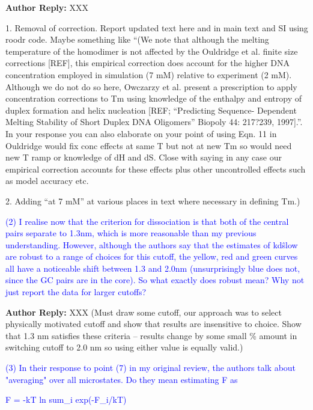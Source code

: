 \documentclass[11pt,a4paper]{letter} %
\begin{document}
\textbf{Author Reply:} XXX 

1. Removal of correction. Report updated text here and in main text and SI using roodr code. Maybe something like ``(We note that although the melting temperature of the homodimer is not affected by the Ouldridge et al. finite size corrections [REF], this empirical correction does account for the higher DNA concentration employed in simulation (7 mM) relative to experiment (2 mM). Although we do not do so here, Owczarzy et al. present a prescription to apply concentration corrections to Tm using knowledge of the enthalpy and entropy of duplex formation and helix nucleation [REF; ``Predicting Sequence- Dependent Melting Stability of Short Duplex DNA Oligomers'' Biopoly 44: 217?239, 1997].''. In your response you can also elaborate on your point of using Eqn. 11 in Ouldridge would fix conc effects at same T but not at new Tm so would need new T ramp or knowledge of dH and dS. Close with saying in any case our empirical correction accounts for these effects plus other uncontrolled effects such as model accuracy etc.


2. Adding ``at 7 mM'' at various places in text where necessary in defining Tm.)




\textcolor{blue}{
(2) I realise now that the criterion for dissociation is that both of the central pairs separate to 1.3nm, which is more reasonable than my previous understanding. However, although the authors say that the estimates of kd\^slow are robust to a range of choices for this cutoff, the yellow, red and green curves all have a noticeable shift between 1.3 and 2.0nm (unsurprisingly blue does not, since the GC pairs are in the core). So what exactly does robust mean? Why not just report the data for larger cutoffs?
}

\textbf{Author Reply:} XXX (Must draw some cutoff, our approach was to select physically motivated cutoff and show that results are insensitive to choice. Show that 1.3 nm satisfies these criteria -- results change by some small \% amount in switching cutoff to 2.0 nm so using either value is equally valid.)






\textcolor{blue}{
(3) In their response to point (7) in my original review, the authors talk about "averaging" over all microstates. Do they mean estimating F as
}

\textcolor{blue}{
F = -kT ln sum\_i  exp(-F\_i/kT)
}
\end{document}

